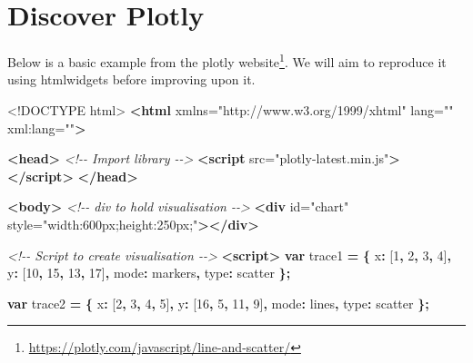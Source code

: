 \documentclass[
]{krantz}
\makeatletter
\newenvironment{Shaded}{\begin{snugshade}}{\end{snugshade}}
\newcommand{\CommentTok}[1]{\textcolor[rgb]{0.37,0.37,0.37}{\textit{#1}}}
\newcommand{\DataTypeTok}[1]{\textcolor[rgb]{0.27,0.27,0.27}{#1}}
\newcommand{\DecValTok}[1]{\textcolor[rgb]{0.06,0.06,0.06}{#1}}
\newcommand{\KeywordTok}[1]{\textcolor[rgb]{0.27,0.27,0.27}{\textbf{#1}}}
\newcommand{\NormalTok}[1]{#1}
\newcommand{\OperatorTok}[1]{\textcolor[rgb]{0.43,0.43,0.43}{\textbf{#1}}}
\newcommand{\OtherTok}[1]{\textcolor[rgb]{0.37,0.37,0.37}{#1}}
\newcommand{\StringTok}[1]{\textcolor[rgb]{0.5,0.5,0.5}{#1}}
\renewcommand{\href}[2]{#2\footnote{\url{#1}}}
\newenvironment{kframe}{%
\medskip{}
\setlength{\fboxsep}{.8em}
 \def\at@end@of@kframe{}%
 \ifinner\ifhmode%
  \def\at@end@of@kframe{\end{minipage}}%
  \begin{minipage}{\columnwidth}%
 \fi\fi%
 \def\FrameCommand##1{\hskip\@totalleftmargin \hskip-\fboxsep
 \colorbox{shadecolor}{##1}\hskip-\fboxsep
     \hskip-\linewidth \hskip-\@totalleftmargin \hskip\columnwidth}%
 \MakeFramed {\advance\hsize-\width
   \@totalleftmargin\z@ \linewidth\hsize
   \@setminipage}}%
 {\par\unskip\endMakeFramed%
 \at@end@of@kframe}
\renewenvironment{Shaded}{\begin{kframe}}{\end{kframe}}
\makeatother
\begin{document}
\hypertarget{discover-plotly}{%
\section{Discover Plotly}\label{discover-plotly}}

Below is a basic example from the \href{https://plotly.com/javascript/line-and-scatter/}{plotly website}. We will aim to reproduce it using htmlwidgets before improving upon it.

\begin{Shaded}
\begin{Highlighting}[]
\DataTypeTok{<!DOCTYPE }\NormalTok{html}\DataTypeTok{>}
\KeywordTok{<html}\OtherTok{ xmlns=}\StringTok{"http://www.w3.org/1999/xhtml"}\OtherTok{ lang=}\StringTok{""}\OtherTok{ xml:lang=}\StringTok{""}\KeywordTok{>}

\KeywordTok{<head>}
  \CommentTok{<!{-}{-} Import library {-}{-}>}
  \KeywordTok{<script}\OtherTok{ src=}\StringTok{"plotly{-}latest.min.js"}\KeywordTok{></script>}
\KeywordTok{</head>}

\KeywordTok{<body>}
  \CommentTok{<!{-}{-} div to hold visualisation {-}{-}>}
  \KeywordTok{<div}\OtherTok{ id=}\StringTok{"chart"}\OtherTok{ style=}\StringTok{"width:600px;height:250px;"}\KeywordTok{></div>}

  \CommentTok{<!{-}{-} Script to create visualisation {-}{-}>}
  \KeywordTok{<script>}
    \KeywordTok{var}\NormalTok{ trace1 }\OperatorTok{=} \OperatorTok{\{}
      \DataTypeTok{x}\OperatorTok{:}\NormalTok{ [}\DecValTok{1}\OperatorTok{,} \DecValTok{2}\OperatorTok{,} \DecValTok{3}\OperatorTok{,} \DecValTok{4}\NormalTok{]}\OperatorTok{,}
      \DataTypeTok{y}\OperatorTok{:}\NormalTok{ [}\DecValTok{10}\OperatorTok{,} \DecValTok{15}\OperatorTok{,} \DecValTok{13}\OperatorTok{,} \DecValTok{17}\NormalTok{]}\OperatorTok{,}
      \DataTypeTok{mode}\OperatorTok{:} \StringTok{\textquotesingle{}markers\textquotesingle{}}\OperatorTok{,}
      \DataTypeTok{type}\OperatorTok{:} \StringTok{\textquotesingle{}scatter\textquotesingle{}}
    \OperatorTok{\};}

    \KeywordTok{var}\NormalTok{ trace2 }\OperatorTok{=} \OperatorTok{\{}
      \DataTypeTok{x}\OperatorTok{:}\NormalTok{ [}\DecValTok{2}\OperatorTok{,} \DecValTok{3}\OperatorTok{,} \DecValTok{4}\OperatorTok{,} \DecValTok{5}\NormalTok{]}\OperatorTok{,}
      \DataTypeTok{y}\OperatorTok{:}\NormalTok{ [}\DecValTok{16}\OperatorTok{,} \DecValTok{5}\OperatorTok{,} \DecValTok{11}\OperatorTok{,} \DecValTok{9}\NormalTok{]}\OperatorTok{,}
      \DataTypeTok{mode}\OperatorTok{:} \StringTok{\textquotesingle{}lines\textquotesingle{}}\OperatorTok{,}
      \DataTypeTok{type}\OperatorTok{:} \StringTok{\textquotesingle{}scatter\textquotesingle{}}
    \OperatorTok{\};}


\end{Highlighting}
\end{Shaded}
\end{document}

